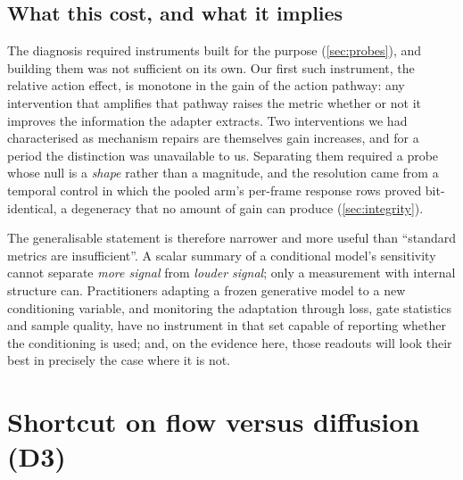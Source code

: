 \subsection{What this cost, and what it implies}

The diagnosis required instruments built for the purpose
(\cref{sec:probes}), and building them was not sufficient on its own. Our
first such instrument, the relative action effect, is monotone in the gain
of the action pathway: any intervention that amplifies that pathway raises
the metric whether or not it improves the information the adapter extracts.
Two interventions we had characterised as mechanism repairs are themselves
gain increases, and for a period the distinction was unavailable to us.
Separating them required a probe whose null is a \emph{shape} rather than a
magnitude, and the resolution came from a temporal control in which the
pooled arm's per-frame response rows proved bit-identical, a degeneracy
that no amount of gain can produce (\cref{sec:integrity}).

The generalisable statement is therefore narrower and more useful than
``standard metrics are insufficient''. A scalar summary of a conditional
model's sensitivity cannot separate \emph{more signal} from \emph{louder
signal}; only a measurement with internal structure can. Practitioners
adapting a frozen generative model to a new conditioning variable, and
monitoring the adaptation through loss, gate statistics and sample quality,
have no instrument in that set capable of reporting whether the conditioning
is used; and, on the evidence here, those readouts will look their best
in precisely the case where it is not.

\section{Shortcut on flow versus diffusion (D3)}
\label{sec:res-shortcut}
